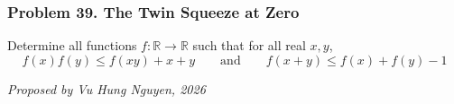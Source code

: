 \subsubsection*{Problem 39. The Twin Squeeze at Zero}

\begin{exercisebox}[medium]

Determine all functions $f:\mathbb R\to\mathbb R$ such that for all real $x,y$,
\[
\boxed{\quad f(x)f(y)\le f(xy)+x+y \qquad\text{and}\qquad f(x+y)\le f(x)+f(y)-1\quad}
\]

\begin{flushright}
\textit{Proposed by Vu Hung Nguyen, 2026}
\end{flushright}


\end{exercisebox}
